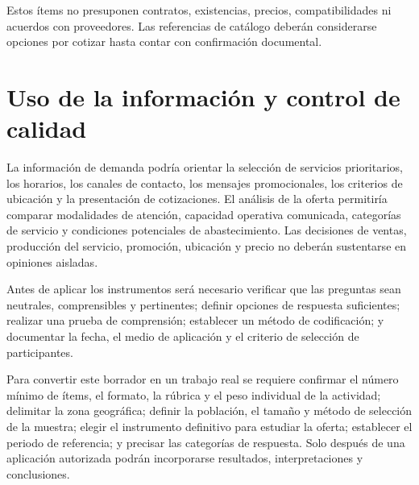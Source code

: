 \documentclass[12pt,letterpaper,oneside]{article}
\begin{document}
Estos ítems no presuponen contratos, existencias, precios, compatibilidades ni acuerdos con proveedores. Las referencias de catálogo deberán considerarse opciones por cotizar hasta contar con confirmación documental.

\section{Uso de la información y control de calidad}

La información de demanda podría orientar la selección de servicios prioritarios, los horarios, los canales de contacto, los mensajes promocionales, los criterios de ubicación y la presentación de cotizaciones. El análisis de la oferta permitiría comparar modalidades de atención, capacidad operativa comunicada, categorías de servicio y condiciones potenciales de abastecimiento. Las decisiones de ventas, producción del servicio, promoción, ubicación y precio no deberán sustentarse en opiniones aisladas.

Antes de aplicar los instrumentos será necesario verificar que las preguntas sean neutrales, comprensibles y pertinentes; definir opciones de respuesta suficientes; realizar una prueba de comprensión; establecer un método de codificación; y documentar la fecha, el medio de aplicación y el criterio de selección de participantes.

Para convertir este borrador en un trabajo real se requiere confirmar el número mínimo de ítems, el formato, la rúbrica y el peso individual de la actividad; delimitar la zona geográfica; definir la población, el tamaño y método de selección de la muestra; elegir el instrumento definitivo para estudiar la oferta; establecer el periodo de referencia; y precisar las categorías de respuesta. Solo después de una aplicación autorizada podrán incorporarse resultados, interpretaciones y conclusiones.
\clearpage
\printbibliography[title={Fuentes de consulta}]
\end{document}
